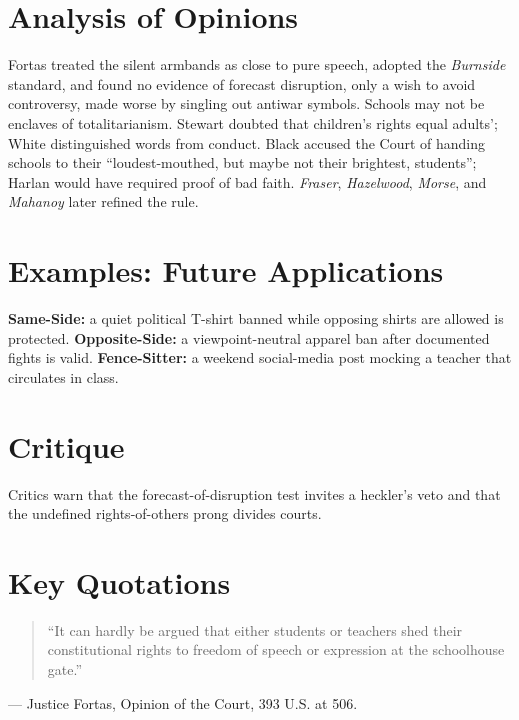 \documentclass[12pt]{article}
\begin{document}
\section{Analysis of Opinions}
Fortas treated the silent armbands as close to pure speech, adopted the \textit{Burnside} standard, and found no evidence of forecast disruption, only a wish to avoid controversy, made worse by singling out antiwar symbols. Schools may not be enclaves of totalitarianism. Stewart doubted that children's rights equal adults'; White distinguished words from conduct. Black accused the Court of handing schools to their ``loudest-mouthed, but maybe not their brightest, students''; Harlan would have required proof of bad faith. \textit{Fraser}, \textit{Hazelwood}, \textit{Morse}, and \textit{Mahanoy} later refined the rule.

\section{Examples: Future Applications}
\textbf{Same-Side:} a quiet political T-shirt banned while opposing shirts are allowed is protected. \textbf{Opposite-Side:} a viewpoint-neutral apparel ban after documented fights is valid. \textbf{Fence-Sitter:} a weekend social-media post mocking a teacher that circulates in class.

\section{Critique}
Critics warn that the forecast-of-disruption test invites a heckler's veto and that the undefined rights-of-others prong divides courts.

\section{Key Quotations}
\begin{quote}
``It can hardly be argued that either students or teachers shed their constitutional rights to freedom of speech or expression at the schoolhouse gate.''
\end{quote}
\noindent --- Justice Fortas, Opinion of the Court, 393 U.S. at 506.
\end{document}
